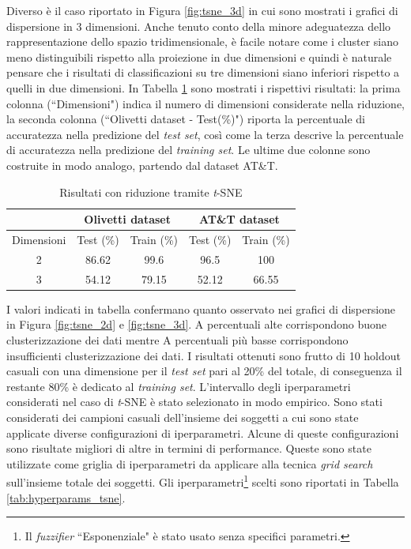 \documentclass[12pt,italian]{report}
\begin{document}
Diverso è il caso riportato in Figura \ref{fig:tsne_3d} in cui sono mostrati i grafici di dispersione in 3 dimensioni. Anche tenuto conto della minore adeguatezza dello rappresentazione dello spazio tridimensionale, è facile notare come i cluster siano meno distinguibili rispetto alla proiezione in due dimensioni e quindi è naturale pensare che i risultati di classificazioni su tre dimensioni siano inferiori rispetto a quelli in due dimensioni. In Tabella \ref{tab:tab_tsne} sono mostrati i rispettivi risultati: la prima colonna (``Dimensioni") indica il numero di dimensioni considerate nella riduzione, la seconda colonna (``Olivetti dataset - Test(\%)") riporta la percentuale di accuratezza nella predizione del \emph{test set}, così come la terza descrive la percentuale di accuratezza nella predizione del \emph{training set}. Le ultime due colonne sono costruite in modo analogo, partendo dal dataset AT\&T.

\begin{table}[h!]
	\centering

		\begin{tabular}{ c|cc|cc }
			\toprule
			\multicolumn{1}{c}{} & \multicolumn{2}{c}{Olivetti dataset} & \multicolumn{2}{c}{AT\&T dataset} \\ \midrule
			Dimensioni             & Test (\%)   & Train    (\%)         & Test    (\%)        & Train    (\%)        \\ \midrule
			2                      &            86.62       &           99.6        &           96.5      &      100            \\ 
			3                      &      54.12             &               79.15    &     52.12            &       66.55           \\ \bottomrule
		\end{tabular}%
	\caption{Risultati con riduzione tramite \emph{t}-SNE}
	\label{tab:tab_tsne}
\end{table}

I valori indicati in tabella confermano quanto osservato nei grafici di dispersione in Figura \ref{fig:tsne_2d} e \ref{fig:tsne_3d}. A percentuali alte corrispondono buone clusterizzazione dei dati mentre A percentuali più basse corrispondono insufficienti clusterizzazione dei dati. I risultati ottenuti sono frutto di 10 holdout casuali con una dimensione per il \emph{test set} pari al 20\% del totale, di conseguenza il restante 80\% è dedicato al \emph{training set}. 
L'intervallo degli iperparametri considerati nel caso di \emph{t}-SNE è stato selezionato in modo empirico. Sono stati considerati dei campioni casuali dell'insieme dei soggetti a cui sono state applicate diverse configurazioni di iperparametri. Alcune di queste configurazioni sono risultate migliori di altre in termini di performance. Queste sono state utilizzate come griglia di iperparametri da applicare alla tecnica \emph{grid search} sull'insieme totale dei soggetti. Gli iperparametri\footnote{Il \emph{fuzzifier} ``Esponenziale" è stato usato senza specifici parametri.} scelti sono riportati in Tabella \ref{tab:hyperparams_tsne}.
\end{document}
